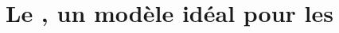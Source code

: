 \documentclass[\main/main.tex]{subfiles}
\begin{document}
\chapter{
    \label{chap:zebra}
    Le \pz{}, un modèle idéal pour les \hcss{}
    }








\end{document}
